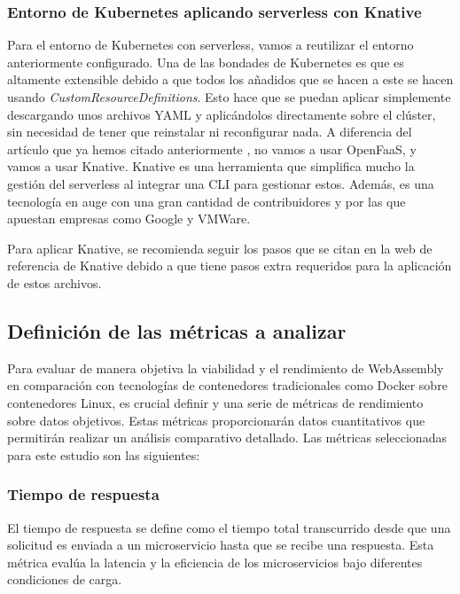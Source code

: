 \subsubsection{Entorno de Kubernetes aplicando serverless con Knative}

Para el entorno de Kubernetes con serverless, vamos a reutilizar el entorno anteriormente configurado. Una de las bondades de Kubernetes es que es altamente extensible debido a que todos los añadidos que se hacen a este se hacen usando \textit{CustomResourceDefinitions}. Esto hace que se puedan aplicar simplemente descargando unos archivos YAML y aplicándolos directamente sobre el clúster, sin necesidad de tener que reinstalar ni reconfigurar nada. A diferencia del artículo que ya hemos citado anteriormente \cite{Kjorveziroski2023}, no vamos a usar OpenFaaS, y vamos a usar Knative. Knative es una herramienta que simplifica mucho la gestión del serverless al integrar una CLI para gestionar estos. Además, es una tecnología en auge con una gran cantidad de contribuidores y por las que apuestan empresas como Google y VMWare.

Para aplicar Knative, se recomienda seguir los pasos que se citan en la web de referencia de Knative \cite{KnativeInstall} debido a que tiene pasos extra requeridos para la aplicación de estos archivos.

\subsection{Definición de las métricas a analizar}

Para evaluar de manera objetiva la viabilidad y el rendimiento de WebAssembly en comparación con tecnologías de contenedores tradicionales como Docker sobre contenedores Linux, es crucial definir y una serie de métricas de rendimiento sobre datos objetivos. Estas métricas proporcionarán datos cuantitativos que permitirán realizar un análisis comparativo detallado. Las métricas seleccionadas para este estudio son las siguientes:

\subsubsection{Tiempo de respuesta}

El tiempo de respuesta se define como el tiempo total transcurrido desde que una solicitud es enviada a un microservicio hasta que se recibe una respuesta. Esta métrica evalúa la latencia y la eficiencia de los microservicios bajo diferentes condiciones de carga.


